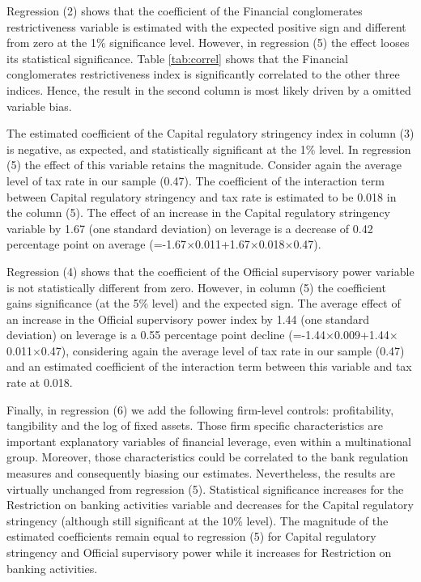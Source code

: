 \documentclass[12pt]{article}
\begin{document}
	  Regression (2) shows that the coefficient of the Financial conglomerates restrictiveness variable is estimated with the expected positive sign and different from zero at the 1\% significance level. However, in regression (5) the effect looses its statistical significance.  Table \ref{tab:correl} shows that the Financial conglomerates restrictiveness index is significantly correlated to the other three indices. Hence, the result in the second column is most likely driven by a omitted variable bias.
	  
	  The estimated coefficient of the Capital regulatory stringency index in column (3) is negative, as expected, and statistically significant at the 1\% level. In regression (5) the effect of this variable retains the magnitude. Consider again the average level of tax rate in our sample (0.47). The coefficient of the interaction term between Capital regulatory stringency and tax rate is estimated to be 0.018 in the column (5). The effect of an increase in the Capital regulatory stringency variable by 1.67 (one standard deviation) on leverage is a decrease of 0.42 percentage point on average (=-1.67$\times$0.011+1.67$\times$0.018$\times$0.47).
	  
	  Regression (4) shows that the coefficient of the Official supervisory power variable is not statistically different from zero. However, in column (5) the coefficient gains significance (at the 5\% level) and the expected sign. The average effect of an increase in the Official supervisory power index by 1.44 (one standard deviation) on leverage is a 0.55 percentage point decline (=-1.44$\times$0.009+1.44$\times$0.011$\times$0.47), considering again the average level of tax rate in our sample (0.47) and an estimated coefficient of the interaction term between this variable and tax rate at 0.018.
	  
	  Finally, in regression (6) we add the following firm-level controls: profitability, tangibility and the log of fixed assets. Those firm specific characteristics are important explanatory variables of financial leverage, even within a multinational group. Moreover, those characteristics could be correlated to the bank regulation measures and consequently biasing our estimates. Nevertheless, the results are virtually unchanged from regression (5). Statistical significance increases for the Restriction on banking activities variable and decreases for the Capital regulatory stringency (although still significant at the 10\% level). The magnitude of the estimated coefficients remain equal to regression (5) for Capital regulatory stringency and Official supervisory power while it increases for Restriction on banking activities.     
	   	    			   		
\end{document}
